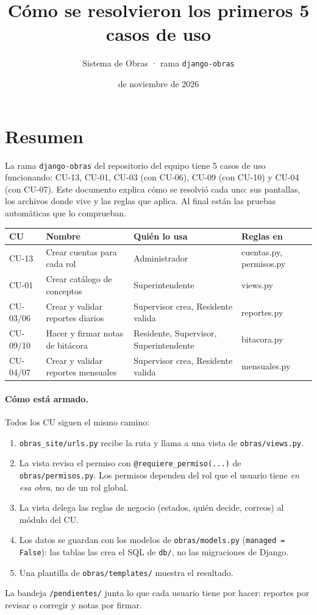 \documentclass[11pt,letterpaper]{article}
\title{\sffamily\bfseries\color{guinda}Cómo se resolvieron los primeros 5 casos de uso}
\author{\sffamily Sistema de Obras · rama \texttt{django-obras}}
\date{\sffamily 11 de noviembre de 2026}
\newcommand{\cod}[1]{\texttt{\small #1}}
\begin{document}
\maketitle

\section{Resumen}
La rama \cod{django-obras} del repositorio del equipo tiene 5 casos de uso funcionando: CU-13, CU-01, CU-03 (con CU-06), CU-09 (con CU-10) y CU-04 (con CU-07). Este documento explica cómo se resolvió cada uno: sus pantallas, los archivos donde vive y las reglas que aplica. Al final están las pruebas automáticas que lo comprueban.

\begin{center}\small{}
\begin{tabularx}{\linewidth}{@{}lL>{\raggedright\arraybackslash}p{3.6cm}>{\ttfamily\footnotesize}p{3cm}@{}}
\toprule\sffamily\bfseries CU & \sffamily\bfseries Nombre & \sffamily\bfseries Quién lo usa & \normalfont\sffamily\bfseries Reglas en\\\midrule
CU-13 & Crear cuentas para cada rol & Administrador & cuentas.py, permisos.py\\
CU-01 & Crear catálogo de conceptos & Superintendente & views.py\\
CU-03/06 & Crear y validar reportes diarios & Supervisor crea, Residente valida & reportes.py\\
CU-09/10 & Hacer y firmar notas de bitácora & Residente, Supervisor, Superintendente & bitacora.py\\
CU-04/07 & Crear y validar reportes mensuales & Supervisor crea, Residente valida & mensuales.py\\
\bottomrule\end{tabularx}\end{center}

\paragraph{Cómo está armado.} Todos los CU siguen el mismo camino:
\begin{enumerate}
  \item \cod{obras\_site/urls.py} recibe la ruta y llama a una vista de \cod{obras/views.py}.
  \item La vista revisa el permiso con \cod{@requiere\_permiso(...)} de \cod{obras/permisos.py}. Los permisos dependen del rol que el usuario tiene \emph{en esa obra}, no de un rol global.
  \item La vista delega las reglas de negocio (estados, quién decide, correos) al módulo del CU.
  \item Los datos se guardan con los modelos de \cod{obras/models.py} (\cod{managed = False}): las tablas las crea el SQL de \cod{db/}, no las migraciones de Django.
  \item Una plantilla de \cod{obras/templates/} muestra el resultado.
\end{enumerate}
La bandeja \cod{/pendientes/} junta lo que cada usuario tiene por hacer: reportes por revisar o corregir y notas por firmar.
\end{document}
